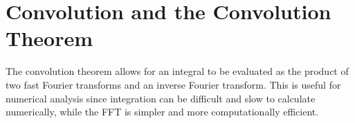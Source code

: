 %
%
%


            \section{Convolution and the Convolution Theorem}

            The convolution theorem allows for an integral to be evaluated as
            the product of two fast Fourier transforms and an inverse Fourier
            transform. This is useful for numerical analysis since integration
            can be difficult and slow to calculate numerically, while the FFT is
            simpler and more computationally efficient.

